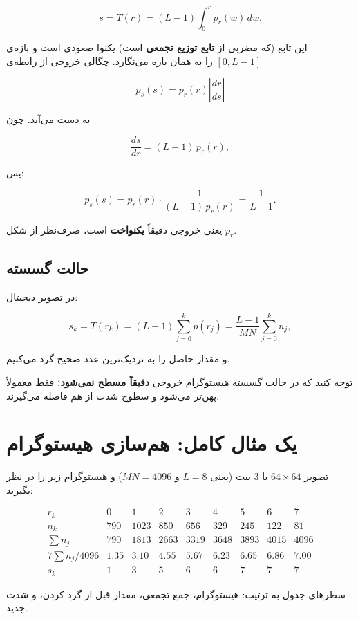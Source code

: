 \documentclass[11pt,a4paper]{article}
\begin{document}
	\[
	s=T(r)=(L-1)\int_{0}^{r}p_r(w)\,dw.
	\]
	
	این تابع (که مضربی از \textbf{تابع توزیع تجمعی} است) یکنوا صعودی است
	و بازه‌ی $[0,L-1]$ را به همان بازه می‌نگارد. چگالی خروجی از رابطه‌ی
	
	\[
	p_s(s)=p_r(r)\left|\frac{dr}{ds}\right|
	\]
	
	به دست می‌آید. چون
	
	\[
	\frac{ds}{dr}=(L-1)\,p_r(r),
	\]
	
	پس:
	
	\[
	p_s(s)=p_r(r)\cdot\frac{1}{(L-1)\,p_r(r)}=\frac{1}{L-1}.
	\]
	
	یعنی خروجی دقیقاً \textbf{یکنواخت} است، صرف‌نظر از شکل $p_r$.
	
	\subsection{حالت گسسته}
	
	در تصویر دیجیتال:
	
	\[
	s_k=T(r_k)=(L-1)\sum_{j=0}^{k}p(r_j)
	=\frac{L-1}{MN}\sum_{j=0}^{k}n_j,
	\]
	
	و مقدار حاصل را به نزدیک‌ترین عدد صحیح گرد می‌کنیم.
	
	توجه کنید که در حالت گسسته هیستوگرام خروجی \textbf{دقیقاً مسطح نمی‌شود}؛
	فقط معمولاً پهن‌تر می‌شود و سطوح شدت از هم فاصله می‌گیرند.
	
	
	\section{یک مثال کامل: هم‌سازی هیستوگرام}
	
	تصویر $64\times64$ با $3$ بیت (یعنی $L=8$ و $MN=4096$) و هیستوگرام زیر را در نظر بگیرید:
	
	\[
	\begin{array}{c|cccccccc}
		r_k & 0 & 1 & 2 & 3 & 4 & 5 & 6 & 7\\
		\hline
		n_k & 790 & 1023 & 850 & 656 & 329 & 245 & 122 & 81\\
		\sum n_j & 790 & 1813 & 2663 & 3319 & 3648 & 3893 & 4015 & 4096\\
		7\sum n_j/4096 & 1.35 & 3.10 & 4.55 & 5.67 & 6.23 & 6.65 & 6.86 & 7.00\\
		s_k & 1 & 3 & 5 & 6 & 6 & 7 & 7 & 7
	\end{array}
	\]
	
	سطرهای جدول به ترتیب: هیستوگرام، جمع تجمعی، مقدار قبل از گرد کردن، و شدت جدید.
	
\end{document}
